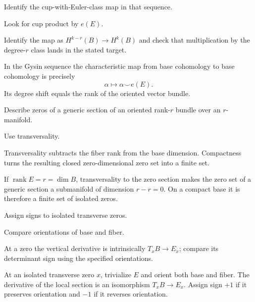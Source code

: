 \begin{exercise}\label{exr:viii32-12}
Identify the cup-with-Euler-class map in that sequence.
\end{exercise}
\begin{hint}
Look for cup product by $e(E)$.

Identify the map as \(H^{k-r}(B)\to H^k(B)\) and check that multiplication by the degree-\(r\) class lands in the stated target.
\end{hint}
\begin{solution}
In the Gysin sequence the characteristic map from base cohomology to base cohomology is precisely
\[
\alpha\longmapsto \alpha\smile e(E).
\]
Its degree shift equals the rank of the oriented vector bundle.
\end{solution}

\begin{exercise}\label{exr:viii32-13}
Describe zeros of a generic section of an oriented rank-$r$ bundle over an $r$-manifold.
\end{exercise}
\begin{hint}
Use transversality.

Transversality subtracts the fiber rank from the base dimension. Compactness turns the resulting closed zero-dimensional zero set into a finite set.
\end{hint}
\begin{solution}
If \(\operatorname{rank}E=r=\dim B\), transversality to the zero section makes the zero set of a generic section a submanifold of dimension \(r-r=0\). On a compact base it is therefore a finite set of isolated zeros.
\end{solution}

\begin{exercise}\label{exr:viii32-14}
Assign signs to isolated transverse zeros.
\end{exercise}
\begin{hint}
Compare orientations of base and fiber.

At a zero the vertical derivative is intrinsically \(T_xB\to E_x\); compare its determinant sign using the specified orientations.
\end{hint}
\begin{solution}
At an isolated transverse zero \(x\), trivialize \(E\) and orient both base and fiber. The derivative of the local section is an isomorphism \(T_xB\to E_x\). Assign sign \(+1\) if it preserves orientation and \(-1\) if it reverses orientation.
\end{solution}

